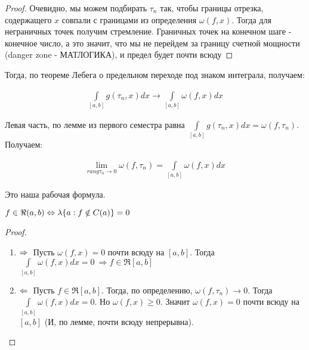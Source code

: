 \begin{proof}
Очевидно, мы можем подбирать $\tau_n$ так, чтобы границы отрезка, содержащего $x$ совпали с границами из определения $\omega(f,x)$. Тогда для неграничных точек получим стремление. Граничных точек на конечном шаге - конечное число, а это значит, что мы не перейдем за границу счетной мощности (danger zone - МАТЛОГИКА), и предел будет почти всюду 
\end{proof}

Тогда, по теореме Лебега о предельном переходе под знаком интеграла, получаем:

\begin{gather*}
\int\limits_{[a, b]}g(\tau_n, x)dx \rightarrow \int\limits_{[a,b]}\omega(f,x)dx
\end{gather*}

Левая часть, по лемме из первого семестра равна $\int\limits_{[a, b]}g(\tau_n, x)dx = \omega(f, \tau_n)$.
Получаем:

\begin{gather*}
\lim\limits_{rang\tau_n \rightarrow 0} \omega(f, \tau_n) = \int\limits_{[a,b]} \omega(f,x)dx
\end{gather*}

Это наша рабочая формула.

\begin{theorem}
$\\ f \in \Re (a, b) \Leftrightarrow \lambda\{ a : f \notin C(a) \} = 0$
\end{theorem}

\begin{proof}
	\begin{enumerate}
		\item 
			$\Rightarrow \\$ Пусть $\omega(f,x) = 0$ почти всюду на $[a, b]$. Тогда $\int\limits_{[a,b]} \omega(f, x)dx = 0 \: \Rightarrow f \in \Re [a,b]$ 
		\item 
			$\Leftarrow \\$ Пусть $f \in \Re [a, b]$. Тогда, по определению, $\omega(f, \tau_n) \rightarrow 0$. Тогда $\int\limits_{[a,b]} \omega(f, x)dx = 0$. Но $\omega(f, x) \geqslant 0$. Значит $\omega(f,x) = 0$ почти всюду на $[a,b]$ (И, по лемме, почти всюду непрерывна).
	\end{enumerate}
\end{proof}
